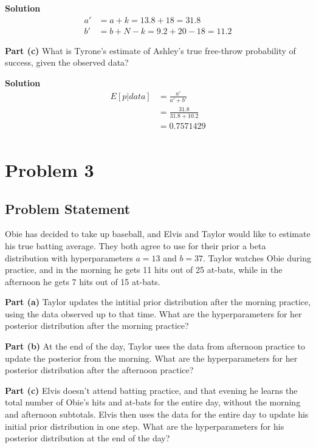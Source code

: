 \documentclass[12pt]{article}
\theoremstyle{definition}
\begin{document}
\noindent
{\bf Solution} 
\begin{align*}
a' &= a + k = 13.8 + 18 = 31.8\\
b' &= b + N - k = 9.2 + 20 - 18 = 11.2
\end{align*}


\noindent
{\bf Part (c)} What is Tyrone's estimate of Ashley's true free-throw probability of success, given the observed data?

\bigskip
\noindent
{\bf Solution} 
\begin{align*}
E[p|data] &= \frac{a'}{a' + b'}\\
&= \frac{31.8}{31.8 + 10.2}\\
&= 0.7571429\\
\end{align*}







\newpage
\section*{Problem 3}

\subsection*{Problem Statement}

Obie has decided to take up baseball, and Elvis and Taylor would like to estimate his true batting average. They both agree to use for their prior a beta distribution with hyperparameters $a = 13$ and $b = 37$. Taylor watches Obie during practice, and in the morning he gets 11 hits out of 25 at-bats, while in the afternoon he gets 7 hits out of 15 at-bats.

\bigskip
\noindent
{\bf Part (a)} Taylor updates the intitial prior distribution after the morning practice, using the data observed up to that time. What are the hyperparameters for her posterior distribution after the morning practice?

\bigskip
\noindent
{\bf Part (b)} At the end of the day, Taylor uses the data from afternoon practice to update the posterior from the morning. What are the hyperparameters for her posterior distribution after the afternoon practice?


\bigskip
\noindent
{\bf Part (c)} Elvis doesn't attend batting practice, and that evening he learns the total number of Obie's hits and at-bats for the entire day, without the morning and afternoon subtotals. Elvis then uses the data for the entire day to update his initial prior distribution in one step. What are the hyperparameters for his posterior distribution at the end of the day?
\end{document}
